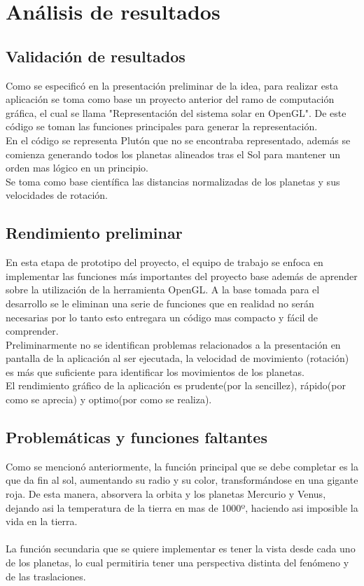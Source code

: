 \documentclass[12pt,journal,compsoc]{IEEEtran}
\begin{document}
\section{Análisis de resultados}
\subsection{Validación de resultados}
Como se especificó en  la presentación preliminar de la idea, para realizar esta aplicación se toma como base un proyecto anterior del ramo de computación gráfica, el cual se llama "Representación del sistema solar en OpenGL". De este código se toman las funciones principales para generar la representación.\\
En el código se representa Plutón que no se encontraba representado, además se comienza generando todos los planetas alineados tras el Sol para mantener un orden mas lógico en un principio.\\
Se toma como base científica las distancias normalizadas de los planetas y sus velocidades de rotación.
\subsection{Rendimiento preliminar}
En esta etapa de prototipo del proyecto, el equipo de trabajo se enfoca en implementar las funciones más importantes del proyecto base además de aprender sobre la utilización de la herramienta OpenGL. A la base tomada para el desarrollo se le eliminan una serie de funciones que en realidad no serán necesarias por lo tanto esto entregara un código mas compacto y fácil de comprender.\\
Preliminarmente no se identifican problemas relacionados a la presentación en pantalla de la aplicación al ser ejecutada, la velocidad de movimiento (rotación) es más que suficiente para identificar los movimientos de los planetas.\\
El rendimiento gráfico de la aplicación es prudente(por la sencillez), rápido(por como se aprecia) y optimo(por como se realiza).
\subsection{Problemáticas y funciones faltantes}
%
Como se mencionó anteriormente, la función principal que se debe completar es la que da fin al sol, aumentando su radio y su color, transformándose en una gigante roja\cite{far}. De esta manera, absorvera la orbita y los planetas Mercurio y Venus, dejando asi la temperatura de la tierra en mas de 1000º, haciendo asi imposible la vida en la tierra.\\
\\
La función secundaria que se quiere implementar es tener la vista desde cada uno de los planetas, lo cual permitiria tener una perspectiva distinta del fenómeno y de las traslaciones.
\end{document}
